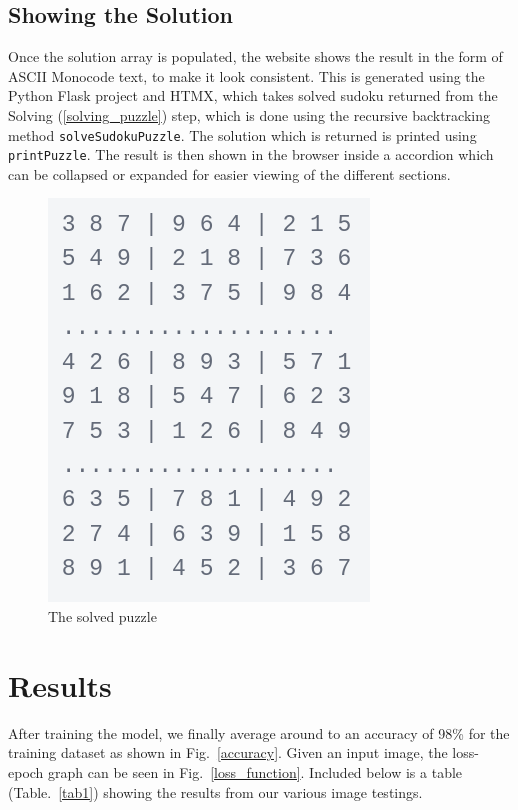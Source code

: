 \documentclass[conference]{IEEEtran}
\begin{document}
\subsection{Showing the Solution}
Once the solution array is populated, the website shows the result in the form of ASCII Monocode text, to make it look consistent. This is generated using the Python Flask project and HTMX, which takes solved sudoku returned from the Solving (\ref{solving_puzzle}) step, which is done using the recursive backtracking method \verb|solveSudokuPuzzle|. The solution which is returned is printed using \verb|printPuzzle|. The result is then shown in the browser inside a accordion which can be collapsed or expanded for easier viewing of the different sections.

\begin{figure}[htbp]
\centerline{\includegraphics[scale=0.5]{assets/solved.png}}
\caption{The solved puzzle}
\label{solved_puzzle}
\end{figure}

\section{Results}
After training the model, we finally average around to an accuracy of 98\% for the training dataset as shown in Fig.~\ref{accuracy}. Given an input image, the loss-epoch graph can be seen in Fig.~\ref{loss_function}. Included below is a table (Table.~\ref{tab1}) showing the results from our various image testings.
\end{document}
